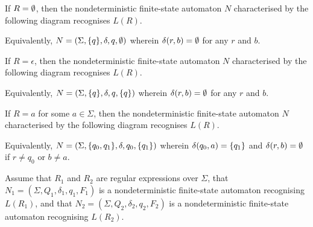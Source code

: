     If \(R = \emptyset\), then the nondeterministic finite-state automaton \(N\)
    characterised by the following diagram recognises \(L(R)\).
    \begin{figure}[!h]
        \centering
    \end{figure}

    \noindent Equivalently, \(N = (\Sigma, \{q\}, \delta, q, \emptyset)\) wherein
    \(\delta(r, b) = \emptyset\) for any \(r\) and \(b\).

    If \(R = \epsilon\), then the nondeterministic finite-state automaton \(N\)
    characterised by the following diagram recognises \(L(R)\).
    \begin{figure}[!h]
        \centering
    \end{figure}

    \noindent Equivalently, \(N = (\Sigma, \{q\}, \delta, q, \{q\})\)
    wherein \(\delta(r, b) = \emptyset\) for any \(r\) and \(b\).

    If \(R = a\) for some \(a \in \Sigma\), then the nondeterministic
    finite-state automaton \(N\) characterised by the following diagram
    recognises \(L(R)\).
    \begin{figure}[!h]
        \centering
    \end{figure}

    \noindent Equivalently, \(N = (\Sigma, \{q_0, q_1\}, \delta, q_0,
    \{q_1\})\) wherein \(\delta(q_0, a) = \{q_1\}\) and \(\delta(r, b) =
    \emptyset\) if \(r \neq q_0\) or \(b \neq a\).

    Assume that \(R_1\) and \(R_2\) are regular expressions over \(\Sigma\),
    that \(N_1 = (\Sigma, Q_1, \delta_1, q_1, F_1)\) is a nondeterministic
    finite-state automaton recognising \(L(R_1)\), and that \(N_2 = (\Sigma,
    Q_2, \delta_2, q_2, F_2)\) is a nondeterministic finite-state automaton
    recognising \(L(R_2)\).

